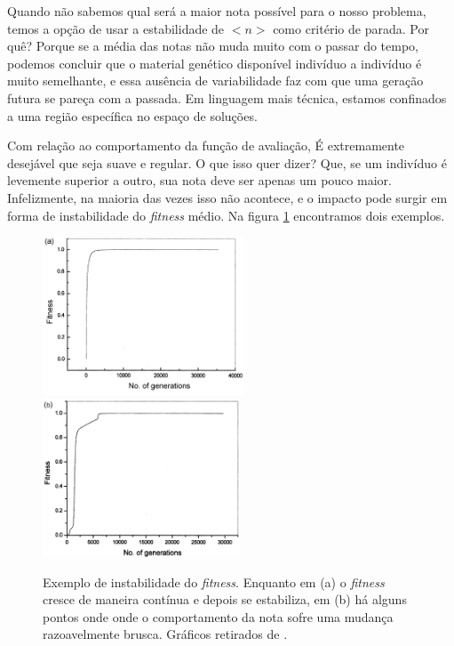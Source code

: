 	
	Quando não sabemos qual será a maior nota possível para o nosso problema, temos a opção de usar a estabilidade de $<n>$ como critério de parada. Por quê? Porque se a média das notas não muda muito com o passar do tempo, podemos concluir que o material genético disponível indivíduo a indivíduo é muito semelhante, e essa ausência de variabilidade faz com que uma geração futura se pareça com a passada. Em linguagem mais técnica, estamos confinados a uma região específica no espaço de soluções.
	
	Com relação ao comportamento da função de avaliação, É extremamente desejável que  seja suave e regular. O que isso quer dizer? Que, se um indivíduo é levemente superior a outro, sua nota deve ser apenas um pouco maior. Infelizmente, na maioria das vezes isso não acontece, e o impacto pode surgir em forma de instabilidade do \textit{fitness} médio. Na figura \ref{figFitness} encontramos dois exemplos.

	\begin{figure}[htp]
		\begin{center}
			\includegraphics[height=4.7cm]{figs/ga/func_aval_estavel.png}
			\includegraphics[height=4.7cm]{figs/ga/func_aval_instavel.png}
		\end{center}
		\caption{\label{figFitness}Exemplo de instabilidade do \textit{fitness}. Enquanto em (a) o \textit{fitness} cresce de maneira contínua e depois se estabiliza, em (b) há alguns pontos onde onde o comportamento da nota sofre uma mudança razoavelmente brusca. Gráficos retirados de \cite{Bhattacharyya2004}.}
	\end{figure}

